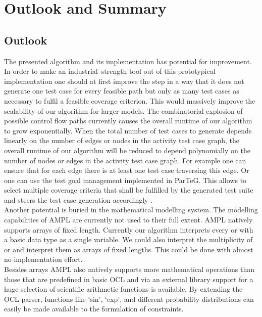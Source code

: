 \chapter{Outlook and Summary}
\section{Outlook}
The presented algorithm and its implementation has potential for improvement.
In order to make an industrial--strength tool out of this prototypical implementation one should at first improve the  step in a way that it does not generate one test case for every feasible path but only as many test cases as necessary to fulfil a feasible coverage criterion. This would massively improve the scalability of our algorithm for larger models. The combinatorial explosion of possible control flow paths currently causes the overall runtime of our algorithm to grow exponentially. When the total number of test cases to generate depends linearly on the number of edges or nodes in the activity test case graph, the overall runtime of our algorithm will be reduced to depend polynomially on the number of nodes or edges in the activity test case graph. For example one can ensure that for each edge there is at least one test case traversing this edge. Or one can use the test goal management implemented in ParTeG. This allows to select multiple coverage criteria that shall be fulfilled by the generated test suite and steers the test case generation accordingly \cite{weissleder2010parteg}.\\
Another potential is buried in the mathematical modelling system. The modelling capabilities of AMPL are currently not used to their full extent. AMPL natively supports arrays of fixed length. Currently our algorithm interprets every  or  with a basic data type as a single variable. We could also interpret the multiplicity of  or  and interpret them as arrays of fixed lengths. This could be done with almost no implementation effort.\\
Besides arrays AMPL also natively supports more mathematical operations than those that are predefined in basic OCL and via an external library support for a huge selection of scientific arithmetic functions is available. By extending the OCL parser, functions like `sin', `exp', and different probability distributions can easily be made available to the formulation of constraints.\\
